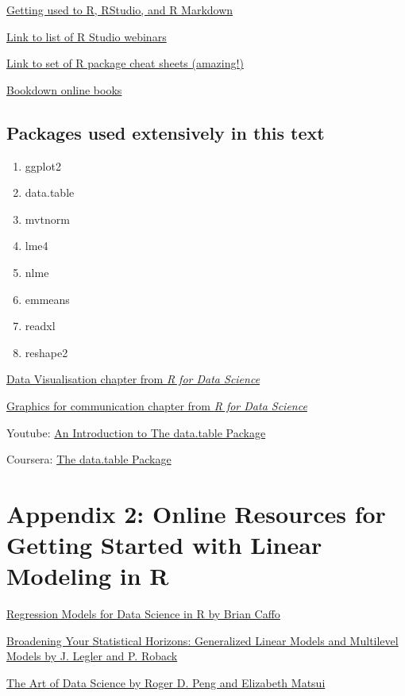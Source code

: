 \documentclass[]{book}
\providecommand{\tightlist}{%
  \setlength{\itemsep}{0pt}\setlength{\parskip}{0pt}}
\theoremstyle{definition}
\theoremstyle{definition}
\theoremstyle{definition}
\theoremstyle{remark}
\begin{document}
\href{https://bookdown.org/chesterismay/rbasics/}{Getting used to R,
RStudio, and R Markdown}

\href{https://www.rstudio.com/resources/webinars/}{Link to list of R
Studio webinars}

\href{https://www.rstudio.com/resources/cheatsheets/}{Link to set of R
package cheat sheets (amazing!)}

\href{https://bookdown.org}{Bookdown online books}

\section{Packages used extensively in this
text}\label{packages-used-extensively-in-this-text}

\begin{enumerate}
\def\labelenumi{\arabic{enumi}.}
\tightlist
\item
  ggplot2
\item
  data.table
\item
  mvtnorm
\item
  lme4
\item
  nlme
\item
  emmeans
\item
  readxl
\item
  reshape2
\end{enumerate}

\href{http://r4ds.had.co.nz/data-visualisation.html}{Data Visualisation
chapter from \emph{R for Data Science}}

\href{http://r4ds.had.co.nz/graphics-for-communication.html}{Graphics
for communication chapter from \emph{R for Data Science}}

Youtube: \href{https://www.youtube.com/watch?v=pc1ARG6kbAM}{An
Introduction to The data.table Package}

Coursera:
\href{https://www.coursera.org/learn/data-cleaning/lecture/trMZ7/the-data-table-package}{The
data.table Package}

\chapter*{Appendix 2: Online Resources for Getting Started with Linear
Modeling in
R}\label{appendix-2-online-resources-for-getting-started-with-linear-modeling-in-r}

\href{https://leanpub.com/regmods}{Regression Models for Data Science in
R by Brian Caffo}

\href{https://bookdown.org/roback/bookdown-bysh/}{Broadening Your
Statistical Horizons: Generalized Linear Models and Multilevel Models by
J. Legler and P. Roback}

\href{https://bookdown.org/rdpeng/artofdatascience/}{The Art of Data
Science by Roger D. Peng and Elizabeth Matsui}


\end{document}
